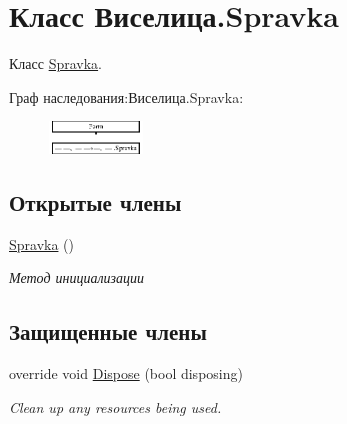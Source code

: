 \hypertarget{class_xD0_x92_xD0_xB8_xD1_x81_xD0_xB5_xD0_xBB_xD0_xB8_xD1_x86_xD0_xB0_1_1_spravka}{\section{Класс Виселица.\+Spravka}
\label{class_xD0_x92_xD0_xB8_xD1_x81_xD0_xB5_xD0_xBB_xD0_xB8_xD1_x86_xD0_xB0_1_1_spravka}
}


Класс \hyperlink{class_xD0_x92_xD0_xB8_xD1_x81_xD0_xB5_xD0_xBB_xD0_xB8_xD1_x86_xD0_xB0_1_1_spravka}{Spravka}.  


Граф наследования\+:Виселица.\+Spravka\+:\begin{figure}[H]
\begin{center}
\leavevmode
\includegraphics[height=0.866873cm]{class_xD0_x92_xD0_xB8_xD1_x81_xD0_xB5_xD0_xBB_xD0_xB8_xD1_x86_xD0_xB0_1_1_spravka}
\end{center}
\end{figure}
\subsection*{Открытые члены}
\begin{DoxyCompactItemize}
\item 
\hyperlink{class_xD0_x92_xD0_xB8_xD1_x81_xD0_xB5_xD0_xBB_xD0_xB8_xD1_x86_xD0_xB0_1_1_spravka_a894952df2d5b24441ea4c59fab5a2f04}{Spravka} ()
\begin{DoxyCompactList}\small\item\em Метод инициализации \end{DoxyCompactList}\end{DoxyCompactItemize}
\subsection*{Защищенные члены}
\begin{DoxyCompactItemize}
\item 
override void \hyperlink{class_xD0_x92_xD0_xB8_xD1_x81_xD0_xB5_xD0_xBB_xD0_xB8_xD1_x86_xD0_xB0_1_1_spravka_af9b0f2ef48d257b2840ea97973929229}{Dispose} (bool disposing)
\begin{DoxyCompactList}\small\item\em Clean up any resources being used. \end{DoxyCompactList}\end{DoxyCompactItemize}


